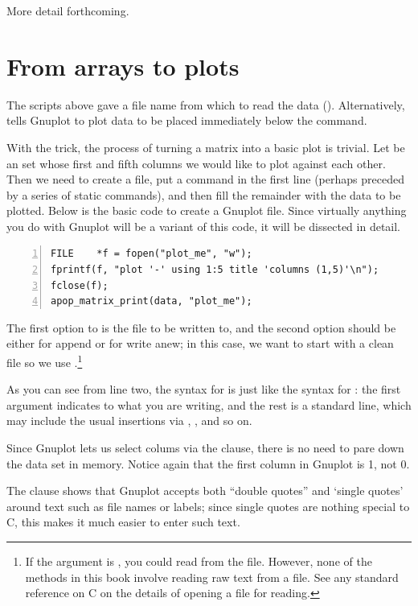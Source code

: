 More detail forthcoming.

\section{From arrays to plots} \label{gnuprint}
The scripts above gave a file name from which to read the data ().  Alternatively,  tells Gnuplot to
plot data to be placed immediately below the  command.

With
the  trick, the process of turning a matrix into a basic plot is
trivial. Let  be an  set whose first and fifth
columns we would like to plot against each other. Then we need to create
a file, put a  command in the first line (perhaps preceded by a series of 
static  commands), and then fill the
remainder with the data to be plotted. Below is the basic code to create
a Gnuplot file. Since virtually anything you do with Gnuplot will be a
variant of this code, it will be dissected in detail.  
  \label{fprintf}
\begin{lstlisting}[numbers=left, numberstyle=\scshape]
FILE    *f = fopen("plot_me", "w");
fprintf(f, "plot '-' using 1:5 title 'columns (1,5)'\n");
fclose(f);
apop_matrix_print(data, "plot_me");
\end{lstlisting}

The first option to  is the file to be written to, and
the second option should be either  for append or  for
write anew; in this case, we want to start with a clean file so we use
.\footnote{If the argument is , you could read from the
file. However, none of the methods in this book involve reading raw text
from a file. See any standard reference on C on the details of opening a
file for reading.} 


As you can see from line two, the syntax for  is just like
the syntax for : the first argument indicates to what you
are writing, and the rest is a standard  line, which may
include the usual insertions via , , and so on.

Since Gnuplot lets us select colums via the  clause, there
is no need to pare down the data set in memory.  Notice again that the
first column in Gnuplot is 1, not 0.

The  clause shows that Gnuplot accepts both ``double quotes''
and `single quotes' around text such as file names or labels; since
single quotes are nothing special to C, this makes it much easier to
enter such text.

